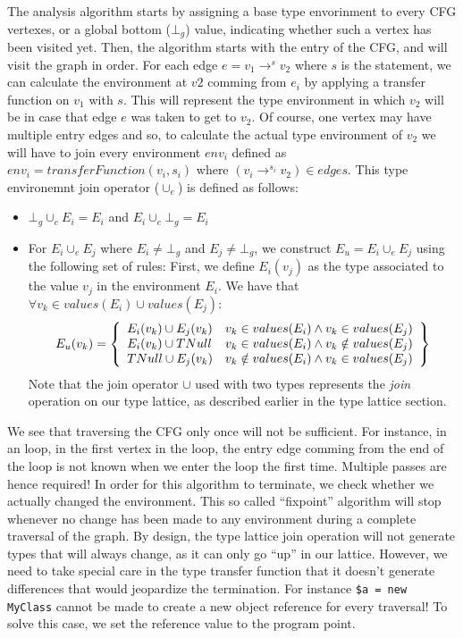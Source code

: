 \documentclass[a4paper]{article}
\begin{document}
The analysis algorithm starts by assigning a base type envorinment to every CFG
vertexes, or a global bottom ($\bot_g$) value, indicating whether such a vertex
has been visited yet. Then, the algorithm starts with the entry of the CFG, and
will visit the graph in order. For each edge $e = v_1 \rightarrow^s v_2$ where
$s$ is the statement, we can calculate the environment at $v2$ comming from
$e_i$ by applying a transfer function on $v_1$ with $s$. This will represent
the type environment in which $v_2$ will be in case that edge $e$ was taken to
get to $v_2$. Of course, one vertex may have multiple entry edges and so, to
calculate the actual type environment of $v_2$ we will have to join every
environment $env_i$ defined as $env_i = transferFunction(v_i, s_i)$ where $(v_i
\rightarrow^{s_i} v_2) \in edges$. This type environemnt join operator
($\cup_e$) is defined as follows:
\begin{itemize}
  \item $\bot_g \cup_e E_i = E_i$ and $E_i \cup_e \bot_g = E_i$
  \item For $E_i \cup_e E_j$ where $E_i \neq \bot_g$ and $E_j \neq \bot_g$, we
    construct $E_u = E_i \cup_e E_j$ using the following set of rules: First,
    we define $E_i(v_j)$ as the type associated to the value $v_j$ in the
    environment $E_i$.  We have that $ \forall v_k \in values(E_i) \cup
    values(E_j):$
    \begin{eqnarray*}
      E_u(v_k) = \left \{ \begin{array}{l l}
        E_i(v_k) \cup E_j(v_k) & v_k \in values(E_i)    \wedge v_k \in values(E_j) \\
        E_i(v_k) \cup TNull    & v_k \in values(E_i)    \wedge v_k \notin values(E_j) \\
        TNull    \cup E_j(v_k) & v_k \notin values(E_i) \wedge v_k \in values(E_j)
      \end{array} \right \}
    \end{eqnarray*}
    Note that the join operator $\cup$ used with two types represents the
    \emph{join} operation on our type lattice, as described earlier in the 
    type lattice section.
\end{itemize}

We see that traversing the CFG only once will not be sufficient. For instance, in
an loop, in the first vertex in the loop, the entry edge comming from the end
of the loop is not known when we enter the loop the first time. Multiple passes
are hence required! In order for this algorithm to terminate, we check whether
we actually changed the environment. This so called ``fixpoint'' algorithm will
stop whenever no change has been made to any environment during a complete
traversal of the graph. By design, the type lattice join operation will not
generate types that will always change, as it can only go ``up'' in our
lattice. However, we need to take special care in the type transfer function that
it doesn't generate differences that would jeopardize the termination. For instance
\verb/$a = new MyClass/ cannot be made to create a new object reference for
every traversal! To solve this case, we set the reference value to the program point.
\end{document}
